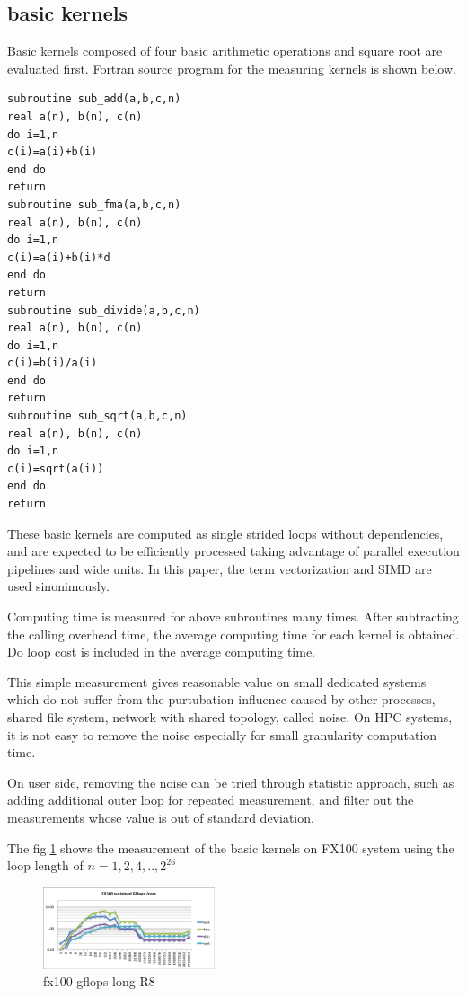 \documentclass[conference]{IEEEtran}
\begin{document}
\begin{table}[b]
\end{table}


\subsection{basic kernels}
\label{subsection:basic-kernels}

Basic kernels composed of four basic arithmetic operations and square root
are evaluated first.
Fortran source program for the measuring kernels is shown below.

\begin{lstlisting}[caption={basic kernels}]
subroutine sub_add(a,b,c,n)
real a(n), b(n), c(n)  
do i=1,n
c(i)=a(i)+b(i)
end do
return
subroutine sub_fma(a,b,c,n)
real a(n), b(n), c(n)  
do i=1,n
c(i)=a(i)+b(i)*d
end do
return
subroutine sub_divide(a,b,c,n)
real a(n), b(n), c(n)  
do i=1,n
c(i)=b(i)/a(i)
end do
return
subroutine sub_sqrt(a,b,c,n)
real a(n), b(n), c(n)  
do i=1,n
c(i)=sqrt(a(i))
end do
return
\end{lstlisting}


These basic kernels are computed as single strided loops without dependencies,
and are expected to be efficiently processed taking advantage of parallel
execution pipelines and wide units.
In this paper, the term vectorization and SIMD are used sinonimously.

Computing time is measured for above subroutines many times.
After subtracting the calling overhead time,
the average computing time for each kernel is obtained.
Do loop cost is included in the average computing time.

This simple measurement gives reasonable value on small dedicated systems
which do not suffer from the purtubation influence caused by
other processes, shared file system, network with shared topology,
called noise.
On HPC systems, it is not easy to remove the noise
especially for small granularity computation time.

On user side, removing the noise can be tried through statistic approach,
such as
adding additional outer loop for repeated measurement, and filter out
the measurements whose value is out of standard deviation.


The fig.\ref{fig:fx100-gflops-long-R8} shows the 
measurement of the basic kernels on FX100 system using the loop length of
\begin{math}
n=1,2,4,..,2^{26}
\end{math}

\begin{figure}[tb]
\centering
\includegraphics[width=0.45\textwidth]{figs/fx100-gflops-long-R8.pdf}
\caption{fx100-gflops-long-R8}
\label{fig:fx100-gflops-long-R8}
\end{figure}
\end{document}
